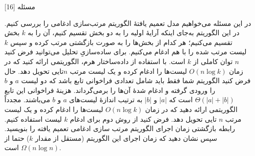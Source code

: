 ‌مسئله [16]

% 
%
%
% 
در این مسئله می‌خواهیم مدل تعمیم یافتۀ الگوریتم مرتب‌سازی ادغامی را بررسی کنیم. در این الگوریتم به‌جای اینکه آرایۀ اولیه را به دو بخش تقسیم کنیم، آن را به $k$ بخش تقسیم می‌کنیم؛ هر کدام از بخش‌ها را به صورت بازگشتی مرتب کرده و سپس $k$ لیست مرتب شده را با هم ادغام می‌کنیم. برای ساده‌سازیِ تحلیل می‌توانید فرض کنید $n$ توان کاملی از $k$ است.
با استفاده از داده‌ساختار هرم، الگوریتمی ارائه کنید که در زمان
$O(n \log{k})$
لیست‌ها را ادغام کرده و یک لیست مرتب $n$تایی تحویل دهد.
حال فرض کنید الگوریتم شما فقط باید شامل تعدادی فراخوانی تابع
باشد که دو لیست $a$ و $b$ را ورودی گرفته و ادغام شدۀ آن‌ها را برمی‌گرداند. هزینۀ فراخوانی این تابع 
$\Theta(|a| + |b|)$
است که $|a|$ و $|b|$ به ترتیب اندازۀ لیست‌های $a$ و $b$ می‌باشند. مجدداً الگوریتمی ارائه دهید که در زمان
$O(n \log{k})$
لیست‌ها را ادغام کرده و یک لیست مرتب $n$ تایی تحویل دهد.
فرض کنید از روش دوم برای ادغام $k$ لیست استفاده کنیم. رابطه بازگشتی زمان اجرای الگوریتم مرتب سازی ادغامی تعمیم یافته را بنویسید. سپس نشان دهید که زمان اجرای این الگوریتم (مستقل از مقدار $k$) حتما از
$\Omega(n \log{n})$
است.

